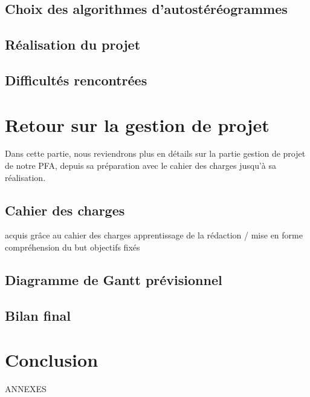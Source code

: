 \documentclass[paper=a4, fontsize=12pt]{article}
\newenvironment{changemargin}[2]{\begin{list}{}{%
      \setlength{\topsep}{0pt}%
      \setlength{\leftmargin}{0pt}%
      \setlength{\rightmargin}{0pt}%
      \setlength{\listparindent}{\parindent}%
      \setlength{\itemindent}{\parindent}%
      \setlength{\parsep}{0pt plus 1pt}%
      \addtolength{\leftmargin}{#1}%
      \addtolength{\rightmargin}{#2}%
    }\item }{\end{list}}
\numberwithin{equation}{section}		%
\numberwithin{figure}{section}			%
\numberwithin{table}{section}				%
\begin{document}
\begin{changemargin}{-1cm}{-1cm}
  \subsection{Choix des algorithmes d'autostéréogrammes}
    
  \subsection{Réalisation du projet}
  
  \subsection{Difficultés rencontrées}
  
  \newpage

  \section{Retour sur la gestion de projet}
  Dans cette partie, nous reviendrons plus en détails sur la partie gestion de projet de notre PFA, depuis sa préparation avec le cahier des charges jusqu'à sa réalisation.
  \subsection{Cahier des charges}
  acquis grâce au cahier des charges
  apprentissage de la rédaction / mise en forme
  compréhension du but
  objectifs fixés
  \subsection{Diagramme de Gantt prévisionnel}
  
  \subsection{Bilan final}
  
  \newpage

  \section{Conclusion}
  
  \newpage

  
  

  \newpage
ANNEXES
\newpage
%

\end{changemargin}

\end{document}
